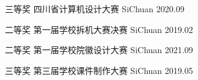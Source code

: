 



\begin{cvhonors}

  \cvhonor
    {三等奖} %
    {四川省计算机设计大赛} %
    {SiChuan} %
    {2020.09} %

  \cvhonor
    {二等奖} %
    {第一届学校拆机大赛决赛} %
    {SiChuan} %
    {2019.02} %

  \cvhonor
    {二等奖} %
    {第一届学校院徽设计大赛} %
    {SiChuan} %
    {2021.09} %

  \cvhonor
    {三等奖} %
    {第三届学校课件制作大赛} %
    {SiChuan} %
    {2019.05} %


\end{cvhonors}

